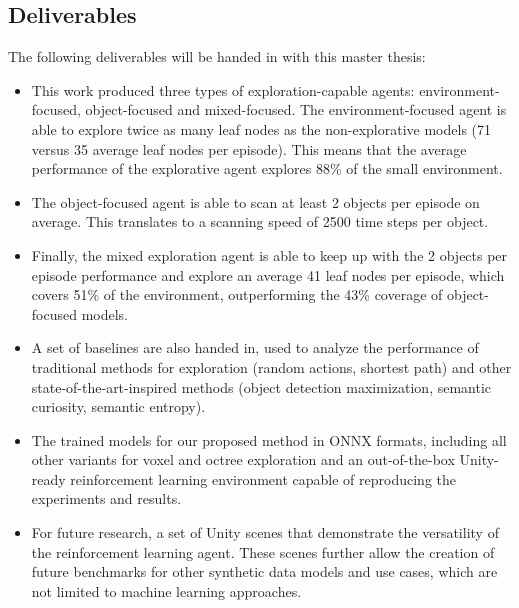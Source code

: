 \subsection{Deliverables}
The following deliverables will be handed in with this master thesis:
\begin{itemize}
    \item This work produced three types of exploration-capable agents: environment-focused, object-focused and mixed-focused.
    The environment-focused agent is able to explore twice as many leaf nodes as the non-explorative models (71 versus 35 average leaf nodes per episode). This means that the average performance of the explorative agent explores 88\% of the small environment. 
    
    \item  The object-focused agent is able to scan at least 2 objects per episode on average. This translates to a scanning speed of 2500 time steps per object.
    
    \item Finally, the mixed exploration agent is able to keep up with the 2 objects per episode performance and explore an average 41 leaf nodes per episode, which covers 51\% of the environment, outperforming the 43\% coverage of object-focused models.
   
   \item A set of baselines are also handed in, used to analyze the performance of traditional methods for exploration (random actions, shortest path) and other state-of-the-art-inspired methods (object detection maximization, semantic curiosity, semantic entropy).
   
    \item The trained models for our proposed method in ONNX formats, including all other variants for voxel and octree exploration and an out-of-the-box Unity-ready reinforcement learning environment capable of reproducing the experiments and results.

    \item For future research, a set of Unity scenes that demonstrate the versatility of the reinforcement learning agent. These scenes further allow the creation of future benchmarks for other synthetic data models and use cases, which are not limited to machine learning approaches.
\end{itemize}
